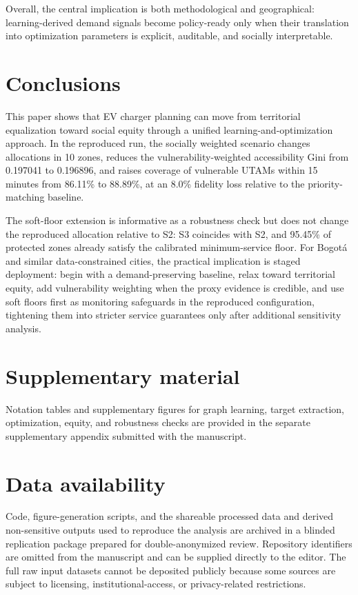\documentclass[final,5p,times,twocolumn,authoryear]{elsarticle}
\begin{document}
Overall, the central implication is both methodological and geographical: learning-derived
demand signals become policy-ready only when their translation into optimization parameters is
explicit, auditable, and socially interpretable.

\section{Conclusions}

This paper shows that EV charger planning can move from territorial equalization toward
social equity through a unified learning-and-optimization approach. In the reproduced run,
the socially weighted scenario changes allocations in 10 zones, reduces the
vulnerability-weighted accessibility Gini from 0.197041 to 0.196896, and raises coverage of
vulnerable UTAMs within 15 minutes from 86.11\% to 88.89\%, at an 8.0\% fidelity loss
relative to the priority-matching baseline.

The soft-floor extension is informative as a robustness check but does not change the
reproduced allocation relative to S2: S3 coincides with S2, and 95.45\% of protected zones
already satisfy the calibrated minimum-service floor. For Bogot\'a and
similar data-constrained cities, the practical implication is staged deployment: begin with a
demand-preserving baseline, relax toward territorial equity, add vulnerability weighting when
the proxy evidence is credible, and use soft floors first as monitoring safeguards in the
reproduced configuration, tightening them into stricter service guarantees only after
additional sensitivity analysis.

\section*{Supplementary material}
Notation tables and supplementary figures for graph learning, target extraction,
optimization, equity, and robustness checks are provided in the separate supplementary
appendix submitted with the manuscript.





\section*{Data availability}
Code, figure-generation scripts, and the shareable processed data and derived non-sensitive
outputs used to reproduce the analysis are archived in a blinded replication package prepared
for double-anonymized review. Repository identifiers are omitted from the manuscript and can
be supplied directly to the editor. The full raw input datasets cannot be deposited publicly
because some sources are subject to licensing, institutional-access, or privacy-related
restrictions.



\end{document}
